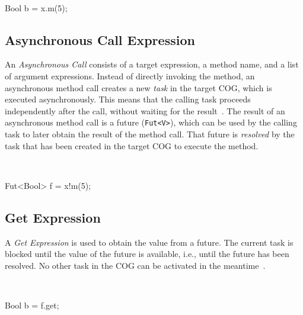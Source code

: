 \begin{abssyntax}
  {}\ \ \ \TRS{(}  \TRS{)}  
\end{abssyntax}

\begin{absexample}
Bool b = x.m(5);  
\end{absexample}

\subsection{Asynchronous Call Expression}
An \emph{Asynchronous Call} consists of a target expression, a method name, and a list of argument expressions.
Instead of directly invoking the method, an asynchronous method call creates a new \emph{task} in the target COG, which is executed asynchronously. This means that the calling task proceeds independently after the call, without waiting for the result~\cite{johnsen10fmco}.
The result of an asynchronous method call is a future (\verb_Fut<V>_), which can be used by the calling
task to later obtain the result of the method call.
That future is \emph{resolved} by the task that has been created in the target COG to execute the method.

\begin{abssyntax}
  {}\ \TRS{!}\ \ \TRS{(}  \TRS{)}  
\end{abssyntax}

\begin{absexample}
Fut<Bool> f = x!m(5);  
\end{absexample}

\subsection{Get Expression}\label{sec:getexpr}
A \emph{Get Expression} is used to obtain the value from a future.
The current task is blocked until the value of the future is available, i.e., until
the future has been resolved. No other task in the COG can be activated in
the meantime~\cite{johnsen10fmco}.

\begin{abssyntax}
  {}\ \ 
\end{abssyntax}

\begin{absexample}
Bool b = f.get;
\end{absexample}


